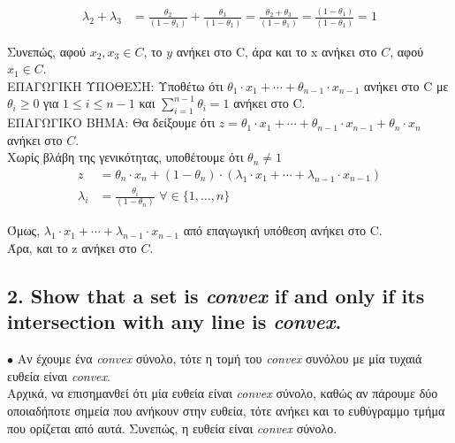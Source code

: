 \documentclass[12pt]{article}
\newcommand{\margin}{\hspace{4pt}}
\begin{document}
\begin{align*}
    λ_2 + λ_3 & = \frac{θ_2}{(1 - θ_1)} + \frac{θ_3}{(1 - θ_1)} = \frac{θ_2 + θ_3}{(1 - θ_1)} = \frac{(1 - θ_1)}{(1 - θ_1)} = 1
\end{align*}

Συνεπώς, αφού $x_2, x_3 \in C$, το $y$ ανήκει στο C, άρα και το x ανήκει στο $C$, αφού $x_1 \in C$. \\

ΕΠΑΓΩΓΙΚΗ ΥΠΟΘΕΣΗ: Υποθέτω ότι $θ_1 \cdot x_1 + \dotsb + θ_{n-1} \cdot x_{n-1}$ ανήκει στο C με $θ_i \geq 0$ για $1 \leq i \leq n-1$ και $ \sum_{i=1}^{n-1}θ_i = 1 $ ανήκει στο C. \\

ΕΠΑΓΩΓΙΚΟ ΒΗΜΑ: Θα δείξουμε ότι $z = θ_1 \cdot x_1 + \dotsb + θ_{n-1} \cdot x_{n-1} + θ_n \cdot x_n$ ανήκει στο $C$. \\

Χωρίς βλάβη της γενικότητας, υποθέτουμε ότι $θ_n \neq 1$\\

\begin{align*}
    z & = θ_n \cdot x_n + (1 - θ_n) \cdot (λ_1 \cdot x_1 + \dotsb + λ_{n-1} \cdot x_{n-1}) \\
    λ_i & = \frac{θ_i}{(1 - θ_n)} \margin \forall \in \lbrace 1, \dotsc, n \rbrace
\end{align*}

Όμως, $λ_1 \cdot x_1 + \dotsb + λ_{n-1} \cdot x_{n-1}$ από επαγωγική υπόθεση ανήκει στο C. \\

Άρα, και το z ανήκει στο $C$.

\vspace{2in}

\pagebreak

\subsection*{2. Show that a set is \textit{convex} if and only if its intersection with any line is \textit{convex}.}

$\bullet$ Αν έχουμε ένα \textit{convex} σύνολο, τότε η τομή του \textit{convex} συνόλου με μία τυχαιά ευθεία είναι \textit{convex}. \\

Αρχικά, να επισημανθεί ότι μία ευθεία είναι \textit{convex} σύνολο,
καθώς αν πάρουμε δύο οποιαδήποτε σημεία που ανήκουν στην ευθεία,
τότε ανήκει και το ευθύγραμμο τμήμα που ορίζεται από αυτά.
Συνεπώς, η ευθεία είναι \textit{convex} σύνολο. \\
\end{document}
